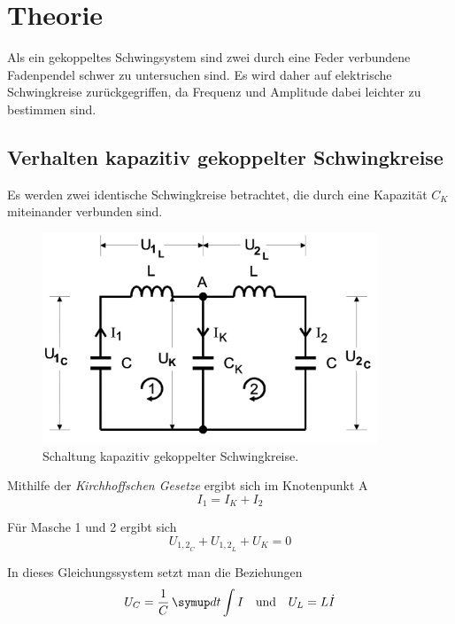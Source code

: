 \section{Theorie}
\label{sec:Theorie}

Als ein gekoppeltes Schwingsystem sind zwei durch eine Feder verbundene Fadenpendel schwer zu untersuchen sind.
Es wird daher auf elektrische Schwingkreise zurückgegriffen, da Frequenz und Amplitude dabei leichter zu bestimmen sind.

\subsection {Verhalten kapazitiv gekoppelter Schwingkreise}

Es werden zwei identische Schwingkreise betrachtet, die durch eine Kapazität $C_{K}$ miteinander verbunden sind.

\begin{figure} 
    \centering
    \includegraphics[width=10cm] {pictures/prinzipschaltbild.png}  
    \caption{Schaltung kapazitiv gekoppelter Schwingkreise. \cite{v355}}
    \label{fig:prinzipschaltbild}
\end{figure} 

Mithilfe der \textit{Kirchhoffschen Gesetze} ergibt sich im Knotenpunkt A
\begin{equation}
    I_{1} = I_{K} + I_{2}
\end{equation}

Für Masche 1 und 2 ergibt sich
\begin{equation}
    U_{{1,2}_{C}} + U_{{1,2}_{L}} + U_{K} = 0
\end{equation}

In dieses Gleichungssystem setzt man die Beziehungen
\begin{align} 
    U_{C} &= \frac{1}{C} \dif{t} \int I  & \mbox{\centering und} && U_{L} = L \dot{I} 
\end{align}

